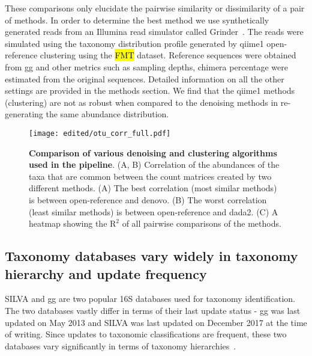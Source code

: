   These comparisons only elucidate the pairwise similarity or dissimilarity of a pair of methods. In order to determine the best method we use synthetically generated reads from an Illumina read simulator called Grinder~\cite{Angly2012}.
  The reads were simulated using the taxonomy distribution profile generated by \ac{qiime1} open-reference clustering using the \hl{FMT} dataset.
  Reference sequences were obtained from \ac{gg} and other metrics such as sampling depths, chimera percentage were estimated from the original sequences.
  Detailed information on all the other settings are provided in the methods section.
  We find that the \ac{qiime1} methods (clustering) are not as robust when compared to the denoising methods in re-generating the same abundance distribution. 

  \begin{figure}[h]
    \centering
    \texttt{[image: edited/otu\_corr\_full.pdf]}
    \caption{
      \textbf{Comparison of various denoising and clustering algorithms used in the pipeline}.
      (A, B) Correlation of the abundances of the taxa that are common between the count matrices created by two different methods.
      (A) The best correlation (most similar methods) is between open-reference and denovo.
      (B) The worst correlation (least similar methods) is between open-reference and dada2.
      (C) A heatmap showing the $\mathrm{R}^2$ of all pairwise comparisons of the methods.
    }
    \label{fig:otu_correlations}
  \end{figure}

  \FloatBarrier

  \subsection*{Taxonomy databases vary widely in taxonomy hierarchy and update frequency}

  SILVA and \ac{gg} are two popular 16S databases used for taxonomy identification.
  The two databases vastly differ in terms of their last update status - \ac{gg} was last updated on May 2013 and SILVA was last updated on December 2017 at the time of writing.
  Since updates to taxonomic classifications are frequent, these two databases vary significantly in terms of taxonomy hierarchies~\cite{Balvociute2017}.

